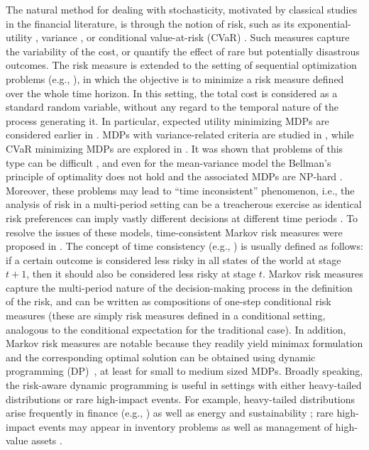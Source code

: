 \documentclass[12pt,technote,onecolumn]{IEEEtran}
\begin{document}
The natural method for dealing with stochasticity, motivated by classical studies in the financial literature, is through the notion of risk, such as its exponential-utility \cite{howard1972risk}, variance \cite{markowitz1968portfolio}, or conditional value-at-risk (CVaR) \cite{rockafellar2000optimization}. Such measures capture the variability of the cost, or quantify the effect of rare but potentially disastrous outcomes. The risk measure is extended to the setting of sequential optimization problems (e.g., \cite{howard1972risk,bauerle2013more}), in which the objective is to minimize a risk measure defined over the whole time horizon. In this setting, the total cost is considered as a standard random variable, without any regard to the temporal nature of the process generating it. In particular, expected utility minimizing MDPs are considered earlier in \cite{kreps1977decisionb}. MDPs with variance-related criteria are studied in \cite{Filar1989}, while CVaR minimizing MDPs are explored in \cite{borkar2014risk}. It was shown that problems of this type can be difficult \cite{le2007robust}, and even for the mean-variance model the Bellman's principle of optimality does not hold and the associated MDPs are NP-hard \cite{mannor2013algorithmic}. Moreover, these problems may lead to ``time inconsistent'' phenomenon, i.e., the analysis of risk in a multi-period setting
can be a treacherous exercise as identical risk preferences can imply vastly different decisions at different time periods \cite{iancu2015tight}. To resolve the issues of these models, time-consistent Markov risk measures were proposed in \cite{ruszczynski2010risk}. The concept of time consistency (e.g., \cite{Shapiro:2009fk}) is usually defined as follows: if a certain outcome is considered less risky in all states of the world at stage $t+1$, then it should also be considered less risky at stage $t$. Markov risk measures capture the multi-period nature of the decision-making process in the definition of the risk, and can be written as compositions of one-step conditional risk measures (these are simply risk measures defined in a conditional setting, analogous to the conditional expectation for the traditional case). In addition, Markov risk measures are notable because they readily yield minimax formulation and the corresponding optimal solution can be obtained using dynamic programming (DP)~\cite{ruszczynski2010risk}, at least for small to medium sized MDPs. Broadly speaking, the risk-aware dynamic programming is useful in settings with either heavy-tailed distributions or rare high-impact events. For example, heavy-tailed distributions arise frequently in finance (e.g., \cite{bystrom2005extreme,kim2011hour}) as well as energy and sustainability \cite{jiang2015approximate}; rare high-impact events may appear in inventory problems \cite{glasserman1996rare} as well as management of high-value assets \cite{enders2010dynamic}. 
\end{document}
